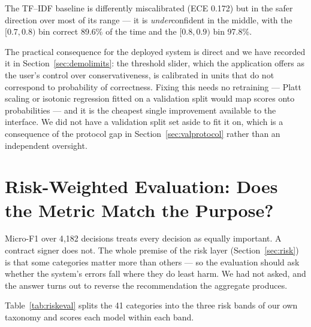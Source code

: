 The TF--IDF baseline is differently miscalibrated (ECE 0.172) but in the safer direction over most of its range --- it is \emph{under}confident in the middle, with the $[0.7, 0.8)$ bin correct 89.6\% of the time and the $[0.8, 0.9)$ bin 97.8\%.

The practical consequence for the deployed system is direct and we have recorded it in Section~\ref{sec:demolimits}: the threshold slider, which the application offers as the user's control over conservativeness, is calibrated in units that do not correspond to probability of correctness. Fixing this needs no retraining --- Platt scaling or isotonic regression fitted on a validation split would map scores onto probabilities --- and it is the cheapest single improvement available to the interface. We did not have a validation split set aside to fit it on, which is a consequence of the protocol gap in Section~\ref{sec:valprotocol} rather than an independent oversight.

\section{Risk-Weighted Evaluation: Does the Metric Match the Purpose?}
\label{sec:riskeval}

Micro-F1 over 4{,}182 decisions treats every decision as equally important. A contract signer does not. The whole premise of the risk layer (Section~\ref{sec:risk}) is that some categories matter more than others --- so the evaluation should ask whether the system's errors fall where they do least harm. We had not asked, and the answer turns out to reverse the recommendation the aggregate produces.

Table~\ref{tab:riskeval} splits the 41 categories into the three risk bands of our own taxonomy and scores each model within each band.

